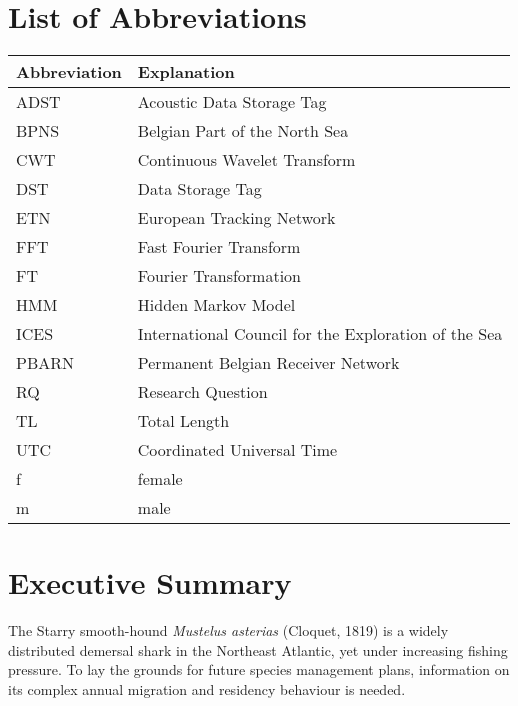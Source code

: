 \documentclass[
  authoryear,
  review,
  3p]{elsarticle}
\renewcommand*\contentsname{Table of contents}
\newcommand\contentsname{Table of contents}
\begin{document}
\renewcommand*\contentsname{Table of contents}
{
\hypersetup{linkcolor=}
\setcounter{tocdepth}{3}
\tableofcontents
}
\newpage{}

\hypertarget{list-of-abbreviations}{%
\section*{List of Abbreviations}\label{list-of-abbreviations}}

\begin{longtable}[]{@{}ll@{}}
\toprule\noalign{}
Abbreviation & Explanation \\
\midrule\noalign{}
\endhead
\bottomrule\noalign{}
\endlastfoot
ADST & Acoustic Data Storage Tag \\
BPNS & Belgian Part of the North Sea \\
CWT & Continuous Wavelet Transform \\
DST & Data Storage Tag \\
ETN & European Tracking Network \\
FFT & Fast Fourier Transform \\
FT & Fourier Transformation \\
HMM & Hidden Markov Model \\
ICES & International Council for the Exploration of the Sea \\
PBARN & Permanent Belgian Receiver Network \\
RQ & Research Question \\
TL & Total Length \\
UTC & Coordinated Universal Time \\
f & female \\
m & male \\
\end{longtable}

\newpage{}

\hypertarget{executive-summary}{%
\section*{Executive Summary}\label{executive-summary}}

The Starry smooth-hound \emph{Mustelus asterias} (Cloquet, 1819) is a
widely distributed demersal shark in the Northeast Atlantic, yet under
increasing fishing pressure. To lay the grounds for future species
management plans, information on its complex annual migration and
residency behaviour is needed.
\end{document}
